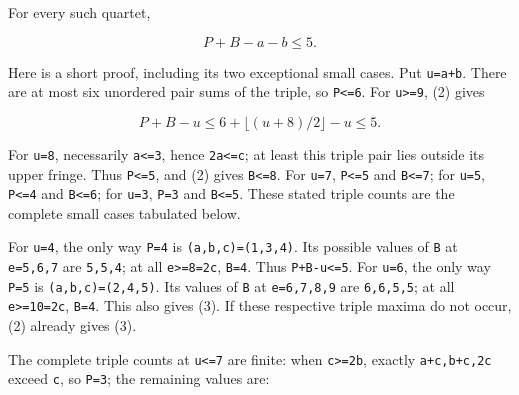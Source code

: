 \documentclass[10pt,a4paper]{article}
\theoremstyle{definition}
\begin{document}
For every such quartet,\allowbreak{}

\[
                         P+\allowbreak{}B-a-b\le5.                \tag{3}
\]

Here is a short proof,\allowbreak{} including its two exceptional small cases. Put
\texttt{u=\allowbreak{}a+\allowbreak{}b}. There are at most six unordered pair
sums of the triple,\allowbreak{} so \texttt{P<=\allowbreak{}6}. For
\texttt{u>=\allowbreak{}9},\allowbreak{} (2) gives

\[
 P+\allowbreak{}B-u\le6+\allowbreak{}\lfloor(u+\allowbreak{}8)/2\rfloor-u\le5.
\]

For \texttt{u=\allowbreak{}8},\allowbreak{} necessarily
\texttt{a<=\allowbreak{}3},\allowbreak{} hence \texttt{2a<=\allowbreak{}c};
at least this triple pair lies outside its upper fringe. Thus
\texttt{P<=\allowbreak{}5},\allowbreak{} and (2) gives
\texttt{B<=\allowbreak{}8}. For \texttt{u=\allowbreak{}7},\allowbreak{}
\texttt{P<=\allowbreak{}5} and \texttt{B<=\allowbreak{}7}; for
\texttt{u=\allowbreak{}5},\allowbreak{} \texttt{P<=\allowbreak{}4} and
\texttt{B<=\allowbreak{}6}; for \texttt{u=\allowbreak{}3},\allowbreak{}
\texttt{P=\allowbreak{}3} and \texttt{B<=\allowbreak{}5}. These
stated triple counts are the complete small cases tabulated below.

For \texttt{u=\allowbreak{}4},\allowbreak{} the only way
\texttt{P=\allowbreak{}4} is
\texttt{(a,\allowbreak{}b,\allowbreak{}c)=\allowbreak{}(1,\allowbreak{}3,\allowbreak{}4)}. Its possible values of
\texttt{B} at \texttt{e=\allowbreak{}5,\allowbreak{}6,\allowbreak{}7} are
\texttt{5,\allowbreak{}5,\allowbreak{}4}; at all
\texttt{e>=\allowbreak{}8=\allowbreak{}2c},\allowbreak{} \texttt{B=\allowbreak{}4}. Thus
\texttt{P+\allowbreak{}B-u<=\allowbreak{}5}. For \texttt{u=\allowbreak{}6},\allowbreak{}
the only way \texttt{P=\allowbreak{}5} is
\texttt{(a,\allowbreak{}b,\allowbreak{}c)=\allowbreak{}(2,\allowbreak{}4,\allowbreak{}5)}. Its values of
\texttt{B} at \texttt{e=\allowbreak{}6,\allowbreak{}7,\allowbreak{}8,\allowbreak{}9} are
\texttt{6,\allowbreak{}6,\allowbreak{}5,\allowbreak{}5}; at all
\texttt{e>=\allowbreak{}10=\allowbreak{}2c},\allowbreak{} \texttt{B=\allowbreak{}4}. This
also gives (3). If these respective triple maxima do not occur,\allowbreak{} (2)
already gives (3).

The complete triple counts at \texttt{u<=\allowbreak{}7} are finite:
when \texttt{c>=\allowbreak{}2b},\allowbreak{} exactly
\texttt{a+\allowbreak{}c,\allowbreak{}b+\allowbreak{}c,\allowbreak{}2c} exceed \texttt{c},\allowbreak{}
so \texttt{P=\allowbreak{}3}; the remaining values are:
\end{document}
